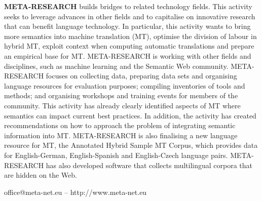 \begin{multicols}{2}
\textbf{META-RESEARCH} builds bridges to related technology
fields. This activity seeks to leverage advances in other fields and
to capitalise on innovative research that can benefit language
technology. In particular, this activity wants to bring more semantics
into machine translation (MT), optimise the division of labour in
hybrid MT, exploit context when computing automatic translations and
prepare an empirical base for MT. META-RESEARCH is working with other
fields and disciplines, such as machine learning and the Semantic Web
community.  META-RESEARCH focuses on collecting data, preparing data
sets and organising language resources for evaluation purposes;
compiling inventories of tools and methods; and organising workshops
and training events for members of the community. This activity has
already clearly identified aspects of MT where semantics can impact
current best practices. In addition, the activity has created
recommendations on how to approach the problem of integrating semantic
information into MT. META-RESEARCH is also finalising a new language
resource for MT, the Annotated Hybrid Sample MT Corpus, which provides
data for English-German, English-Spanish and English-Czech language
pairs. META-RESEARCH has also developed software that collects
multilingual corpora that are hidden on the Web.
\end{multicols}

\vfill
\centerline{office@meta-net.eu -- http://www.meta-net.eu}

\cleardoublepage

\appendix
{}



  
\cleardoublepage

\label{metanetmembers}


\small

